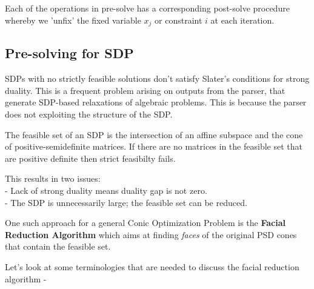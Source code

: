 \documentclass[twoside]{article}
\begin{document}
\begin{multicols}{2}
Each of the operations in pre-solve has a corresponding post-solve procedure whereby we 'unfix' the fixed variable $x_j$ or constraint $i$ at each iteration. 
\vspace*{-\baselineskip}

\subsection{\textbf{Pre-solving for SDP}}

SDPs with no strictly feasible solutions don't satisfy Slater's conditions for strong duality. This is a frequent problem arising on outputs from the parser, that generate SDP-based relaxations of algebraic problems. This is because the parser does not exploiting the structure of the SDP. 

The feasible set of an SDP is the intersection of an affine subspace and the cone of positive-semidefinite matrices. If there are no matrices in the feasible set that are positive definite then strict feasibilty fails. 

This results in two issues: \\- Lack of strong duality means duality gap is not zero. \\- The SDP is unnecessarily large; the feasible set can be reduced. 


One such approach for a general Conic Optimization Problem is the \textbf{Facial Reduction Algorithm} which aims at finding \textit{faces} of the original PSD cones that contain the feasible set. 

Let's look at some terminologies that are needed to discuss the facial reduction algorithm - 


\end{multicols}
\end{document}

